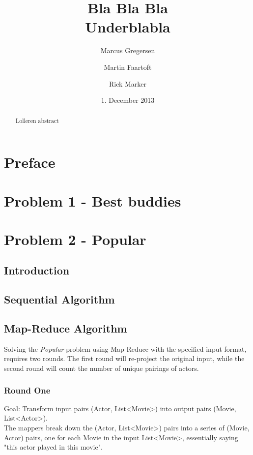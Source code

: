 \documentclass[a4paper,11pt]{article}
\begin{document}
\date{1. December 2013}
\title{Bla Bla Bla\\Underblabla}
\author{Marcus Gregersen\and Martin Faartoft\and Rick Marker}
\clearpage\maketitle
\thispagestyle{empty}
\begin{abstract}
Lolleren abstract
\end{abstract}
\newpage
\setcounter{page}{1}
\section{Preface}
\section{Problem 1 - Best buddies}

\section{Problem 2 - Popular}
\subsection{Introduction}
\subsection{Sequential Algorithm}
\subsection{Map-Reduce Algorithm}
Solving the \emph{Popular} problem using Map-Reduce with the specified input format, requires two rounds. The first round will re-project the original input, while the second round will count the number of unique pairings of actors.

\subsubsection{Round One}
Goal: Transform input pairs (Actor, List<Movie>) into output pairs (Movie, List<Actor>).\\

The mappers break down the (Actor, List<Movie>) pairs into a series of (Movie, Actor) pairs, one for each Movie in the input List<Movie>, essentially saying "this actor played in this movie".\\
\end{document}

